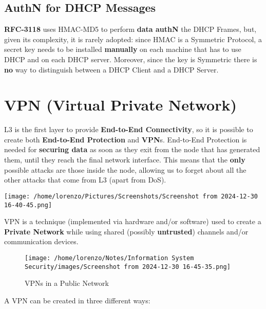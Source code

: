 \subsection{AuthN for DHCP Messages}
\textbf{RFC-3118} uses HMAC-MD5 to perform \textbf{data authN} the DHCP Frames, but, given its complexity, it is rarely adopted: since HMAC is a Symmetric Protocol, a secret key needs to be installed \textbf{manually} on each machine that has to use DHCP and on each DHCP server. Moreover, since the key is Symmetric there is \textbf{no} way to distinguish between a DHCP Client and a DHCP Server.
\newpage
\section{VPN (Virtual Private Network)}
\begin{minipage}{0.6\textwidth}
L3 is the first layer to provide \textbf{End-to-End Connectivity}, so it is possible to create both
\textbf{End-to-End Protection} and \textbf{VPN}s. End-to-End Protection is needed for \textbf{securing data} as soon as they exit from the node that has generated them, until they reach the final network interface. This means that the \textbf{only} possible attacks are those inside the node, allowing us to forget about all the other attacks that come from L3 (apart from DoS). 
\end{minipage} 
\hspace{0.3cm}
\begin{minipage}{0.4\textwidth}
    \centering
    \texttt{[image: /home/lorenzo/Pictures/Screenshots/Screenshot from 2024-12-30 16-40-45.png]}
\end{minipage}
\noindent
VPN is a technique (implemented via hardware and/or software) used to create a \textbf{Private Network} while using shared (possibly \textbf{untrusted}) channels and/or communication devices.
\begin{figure}[H]
    \centering
    \texttt{[image: /home/lorenzo/Notes/Information System Security/images/Screenshot from 2024-12-30 16-45-35.png]}
    \caption{VPNs in a Public Network}
\end{figure}
A VPN can be created in three different ways:
